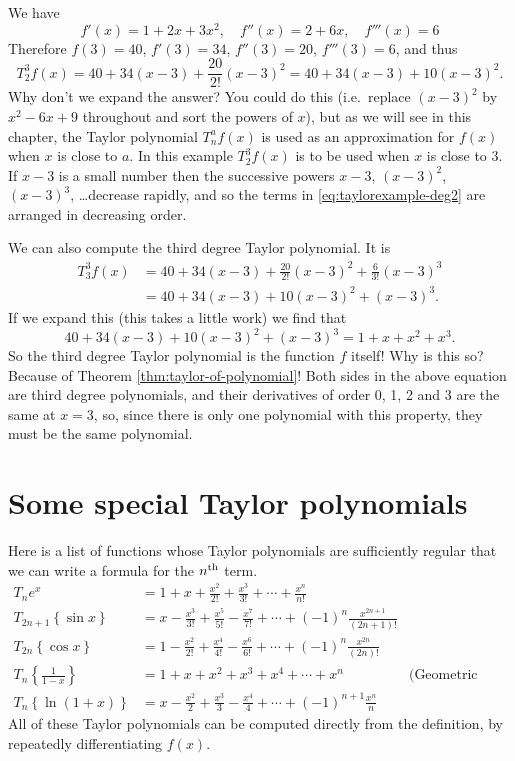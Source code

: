 We have
\[
f'(x) = 1+2x+3x^2, \quad f''(x) = 2+6x,\quad f'''(x) = 6
\]
Therefore $f(3) = 40$, $f'(3) = 34$, $f''(3) = 20$, $f'''(3) = 6$, and thus
\begin{equation}\label{eq:taylorexample-deg2}
  T_2^3f(x)= 40 + 34(x-3) + \frac{20}{2!}(x-3)^2
  = 40 + 34(x-3) + 10(x-3)^2.
\end{equation}
Why don't we expand the answer?  You could do this (i.e.\ replace $(x-3)^2$
by $x^2-6x+9$ throughout and sort the powers of $x$), but as we will see in
this chapter, the Taylor polynomial $T_n^af(x)$ is used as an approximation
for $f(x)$ when $x$ is close to $a$.  In this example $T_2^3f(x)$ is to be
used when $x$ is close to $3$.  If $x-3$ is a small number then the
successive powers $x-3$, $(x-3)^2$, $(x-3)^3$, \ldots decrease rapidly, and
so the terms in \eqref{eq:taylorexample-deg2} are arranged in decreasing
order.

We can also compute the third degree Taylor polynomial. It is
\begin{align*}
  T_3^3f(x)
  &= 40 + 34(x-3) + \frac{20}{2!}(x-3)^2 + \frac{6}{3!} (x-3)^3\\
  &= 40 + 34(x-3) + 10(x-3)^2 + (x-3)^3.
\end{align*}
If we expand this (this takes a little work) we find that
\[
40 + 34(x-3) + 10(x-3)^2 + (x-3)^3 = 1+x+x^2+x^3.
\]
So the third degree Taylor polynomial is the function $f$ itself!  Why is
this so?  Because of Theorem \ref{thm:taylor-of-polynomial}!  Both sides in
the above equation are third degree polynomials, and their derivatives of
order 0, 1, 2 and 3 are the same at $x=3$, so, since there is only one
polynomial with this property, they must be the same polynomial.



\section{Some special Taylor polynomials} \label{sec:some-special-taylor} %
Here is a list of functions whose Taylor polynomials are sufficiently
regular that we can write a formula for the $n^{\rm th}$ term.
\begin{align*}
  T_ne^x  &= 1+x+\frac{x^2}{2!}+\frac{x^3}{3!}+\cdots +\frac{x^n}{n!}\\
  T_{2n+1}\left\{\sin x\right\} &=
  x-\frac{x^3}{3!}+\frac{x^5}{5!}-\frac{x^7}{7!}+\cdots+
  (-1)^n\frac{x^{2n+1}}{(2n+1)!} \\
  T_{2n}\left\{\cos x\right\} &= 1-\frac{x^2}{2!}+\frac{x^4}{4!}-\frac{x^6}{6!}
  +\cdots+(-1)^n \frac{x^{2n}}{(2n)!} \\
  T_n\left\{\frac1{1-x}\right\} &=
  1+x+x^2+x^3+x^4+\cdots +x^n &\text{(Geometric Sum)}\\
  T_n\left\{\ln(1+x)\right\} & =x-\frac{x^2}{2}+\frac{x^3}3-\frac{x^4}4 +\cdots
  +(-1)^{n+1}\frac{x^n}{n}
\end{align*}
All of these Taylor polynomials can be computed directly from the
definition, by repeatedly differentiating $f(x)$.

